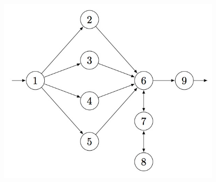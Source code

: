 \documentclass[a4paper,11pt]{report}
\begin{document}
{{{\begin{figure}[H]
\begin{center}
\includegraphics[scale=0.75]{img/bs43.jpg} \end{center} \end{figure}   }

 }

 }

 
\end{document}
